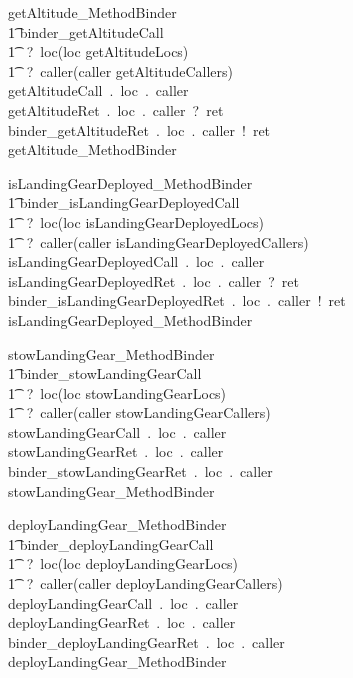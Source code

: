 %
%
\begin{circusaction}
getAltitude\_MethodBinder \circdef \\
	\t1 \circblockopen
	binder\_getAltitudeCall\\ \t1 ~?~loc\prefixcolon(loc \in getAltitudeLocs)\\ \t1 ~?~caller\prefixcolon(caller \in getAltitudeCallers)  \then \\
	getAltitudeCall~.~loc~.~caller  \then \\
	getAltitudeRet~.~loc~.~caller~?~ret \then \\
	binder\_getAltitudeRet~.~loc~.~caller~!~ret  \then \\
	getAltitude\_MethodBinder
	\circblockclose
\end{circusaction}
%
%
\begin{circusaction}
isLandingGearDeployed\_MethodBinder \circdef \\
	\t1 \circblockopen
	binder\_isLandingGearDeployedCall\\ \t1 ~?~loc\prefixcolon(loc \in isLandingGearDeployedLocs)\\ \t1 ~?~caller\prefixcolon(caller \in isLandingGearDeployedCallers)  \then \\
	isLandingGearDeployedCall~.~loc~.~caller  \then \\
	isLandingGearDeployedRet~.~loc~.~caller~?~ret \then \\
	binder\_isLandingGearDeployedRet~.~loc~.~caller~!~ret  \then \\
	isLandingGearDeployed\_MethodBinder
	\circblockclose
\end{circusaction}
%
%
\begin{circusaction}
stowLandingGear\_MethodBinder \circdef \\
	\t1 \circblockopen
	binder\_stowLandingGearCall\\ \t1 ~?~loc\prefixcolon(loc \in stowLandingGearLocs)\\ \t1 ~?~caller\prefixcolon(caller \in stowLandingGearCallers)  \then \\
	stowLandingGearCall~.~loc~.~caller  \then \\
	stowLandingGearRet~.~loc~.~caller \then \\
	binder\_stowLandingGearRet~.~loc~.~caller  \then \\
	stowLandingGear\_MethodBinder
	\circblockclose
\end{circusaction}
%
%
\begin{circusaction}
deployLandingGear\_MethodBinder \circdef \\
	\t1 \circblockopen
	binder\_deployLandingGearCall\\ \t1 ~?~loc\prefixcolon(loc \in deployLandingGearLocs)\\ \t1 ~?~caller\prefixcolon(caller \in deployLandingGearCallers)  \then \\
	deployLandingGearCall~.~loc~.~caller  \then \\
	deployLandingGearRet~.~loc~.~caller \then \\
	binder\_deployLandingGearRet~.~loc~.~caller  \then \\
	deployLandingGear\_MethodBinder
	\circblockclose
\end{circusaction}
